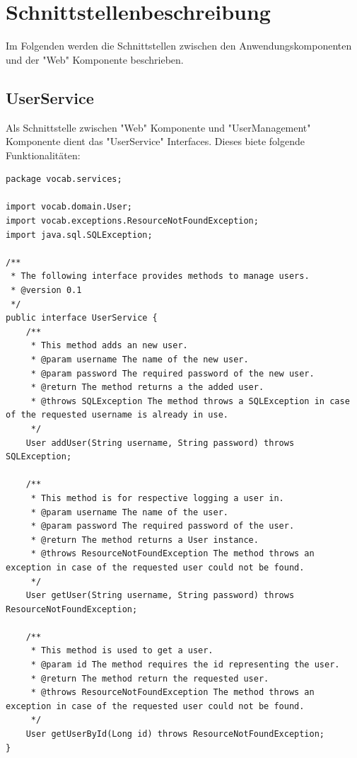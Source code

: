 \chapter{Schnittstellenbeschreibung}
Im Folgenden werden die Schnittstellen zwischen den Anwendungskomponenten und der "Web" Komponente beschrieben.
\section*{UserService}
Als Schnittstelle zwischen "Web" Komponente und "UserManagement" Komponente dient das "UserService" Interfaces. Dieses biete folgende Funktionalitäten:
\begin{lstlisting}
package vocab.services;

import vocab.domain.User;
import vocab.exceptions.ResourceNotFoundException;    
import java.sql.SQLException;

/**
 * The following interface provides methods to manage users.
 * @version 0.1
 */    
public interface UserService {
    /**
     * This method adds an new user.
     * @param username The name of the new user.
     * @param password The required password of the new user.
     * @return The method returns a the added user.
     * @throws SQLException The method throws a SQLException in case of the requested username is already in use.
     */
    User addUser(String username, String password) throws SQLException;

    /**
     * This method is for respective logging a user in.
     * @param username The name of the user.
     * @param password The required password of the user.
     * @return The method returns a User instance.
     * @throws ResourceNotFoundException The method throws an exception in case of the requested user could not be found.
     */
    User getUser(String username, String password) throws ResourceNotFoundException;

    /**
     * This method is used to get a user.
     * @param id The method requires the id representing the user.
     * @return The method return the requested user.
     * @throws ResourceNotFoundException The method throws an exception in case of the requested user could not be found.
     */
    User getUserById(Long id) throws ResourceNotFoundException;
}
\end{lstlisting}
